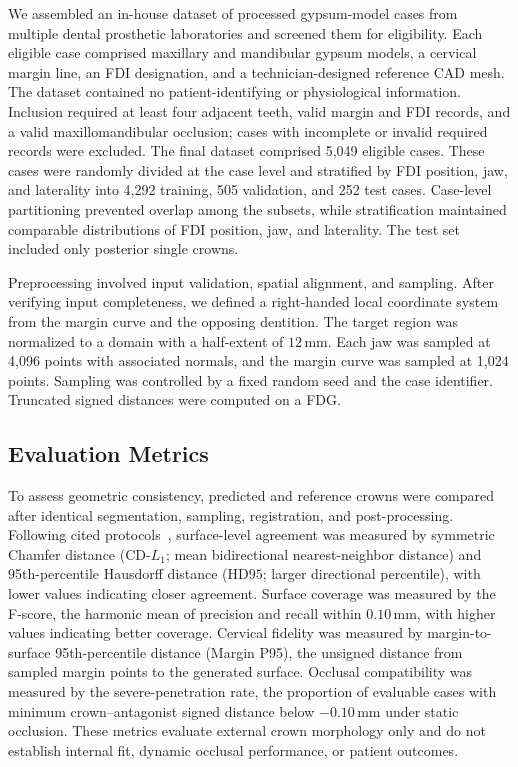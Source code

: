 \documentclass[preprint,review,12pt]{elsarticle}
\begin{document}
\hspace{2em}We assembled an in-house dataset of processed gypsum-model cases from multiple dental prosthetic laboratories and screened them for eligibility. Each eligible case comprised maxillary and mandibular gypsum models, a cervical margin line, an FDI designation, and a technician-designed reference CAD mesh. The dataset contained no patient-identifying or physiological information. Inclusion required at least four adjacent teeth, valid margin and FDI records, and a valid maxillomandibular occlusion; cases with incomplete or invalid required records were excluded. The final dataset comprised 5,049 eligible cases. These cases were randomly divided at the case level and stratified by FDI position, jaw, and laterality into 4,292 training, 505 validation, and 252 test cases. Case-level partitioning prevented overlap among the subsets, while stratification maintained comparable distributions of FDI position, jaw, and laterality. The test set included only posterior single crowns.

\hspace{2em}Preprocessing involved input validation, spatial alignment, and sampling. After verifying input completeness, we defined a right-handed local coordinate system from the margin curve and the opposing dentition. The target region was normalized to a domain with a half-extent of \(12\,\mathrm{mm}\). Each jaw was sampled at 4,096 points with associated normals, and the margin curve was sampled at 1,024 points. Sampling was controlled by a fixed random seed and the case identifier. Truncated signed distances were computed on a FDG.

\subsection{Evaluation Metrics}\label{subsec4_2}

\hspace{2em}To assess geometric consistency, predicted and reference crowns were compared after identical segmentation, sampling, registration, and post-processing. Following cited protocols~\cite{Hosseinimanesh2025PointToMesh,Yang2024DCrownFormer,Yang2025DCrownFormerPlus,Wei2025VBCD}, surface-level agreement was measured by symmetric Chamfer distance (\(\mathrm{CD}\text{-}L_1\); mean bidirectional nearest-neighbor distance) and 95th-percentile Hausdorff distance (\(\mathrm{HD95}\); larger directional percentile), with lower values indicating closer agreement. Surface coverage was measured by the F-score, the harmonic mean of precision and recall within \(0.10\,\mathrm{mm}\), with higher values indicating better coverage. Cervical fidelity was measured by margin-to-surface 95th-percentile distance (Margin P95), the unsigned distance from sampled margin points to the generated surface. Occlusal compatibility was measured by the severe-penetration rate, the proportion of evaluable cases with minimum crown--antagonist signed distance below \(-0.10\,\mathrm{mm}\) under static occlusion. These metrics evaluate external crown morphology only and do not establish internal fit, dynamic occlusal performance, or patient outcomes.
\end{document}
